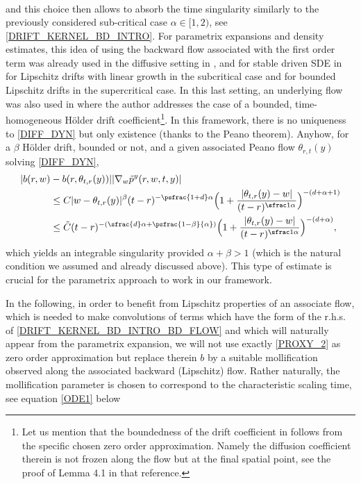 {\begin{align*}
\end{align*}
and this choice then allows to absorb the time singularity similarly to the previously considered sub-critical case $\alpha\in [1,2) $, see \eqref{DRIFT_KERNEL_BD_INTRO}. For parametrix expansions and density estimates, this idea of using the backward flow associated with the first order term was already used in the diffusive setting in \cite{kona:meno:molc:10}, \cite{dela:meno:10} and for stable driven SDE in~\cite{huan:15} for Lipschitz drifts with linear growth in the subcritical case and \cite{knop:kuli:18} for bounded Lipschitz drifts in the supercritical case. In this last setting, an underlying flow was also used in \cite{kuli:19} where the author addresses the case of a bounded, time-homogeneous Hölder drift coefficient\footnote{Let us mention that the boundedness of the drift coefficient in \cite{kuli:19} follows from the specific chosen zero order approximation. Namely the diffusion coefficient therein is not frozen along the flow but at the final spatial point, see \eg the proof of Lemma 4.1 in that reference.}. In this framework, there is no uniqueness to \eqref{DIFF_DYN} but only existence (thanks to the Peano theorem). Anyhow, for a $\beta$ Hölder drift, bounded or not, and a given associated Peano flow $\theta_{r,t}(y) $ solving \eqref{DIFF_DYN},
\begin{equation}\label{DRIFT_KERNEL_BD_INTRO_BD_FLOW}
\begin{aligned}
|b(r,w)&-b(r,\theta_{t,r}(y))||\nabla_w \tilde p^y(r,w,t,y)|\\
&\le  C |w-\theta_{t,r}(y)|^\beta(t-r)^{-\psfrac{1+d}\alpha}\Bigl(1+\frac{|\theta_{t,r}(y)-w|}{(t-r)^{\sfrac 1\alpha}}\Bigr)^{-(d+\alpha+1)}\\
&\le  \tilde C (t-r)^{-(\sfrac{d}\alpha+\psfrac{1-\beta}{\alpha} )}\Bigl(1+\frac{|\theta_{t,r}(y)-w|}{(t-r)^{\sfrac 1\alpha}}\Bigr)^{-(d+\alpha)},
\end{aligned}
\end{equation}
which yields an integrable singularity provided $\alpha+\beta>1 $ (which is the natural condition we assumed and already discussed above). This type of estimate is crucial for the parametrix approach to work in our framework.}

{In the following, in order to benefit from Lipschitz properties of an associate flow, which is \eg needed to make convolutions of terms which have the form of the r.h.s. of \eqref{DRIFT_KERNEL_BD_INTRO_BD_FLOW} and which will naturally appear from the parametrix expansion, we will not use exactly \eqref{PROXY_2} as zero order approximation but replace therein $b $ by a suitable mollification observed along the associated backward (Lipschitz) flow. Rather naturally, the mollification parameter is chosen to correspond to the characteristic scaling time, see equation \eqref{ODE1} below}

